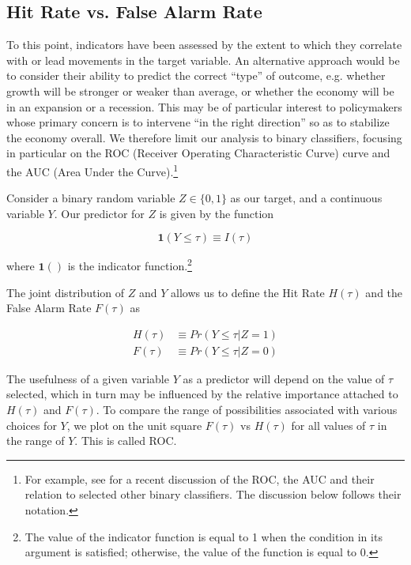 \documentclass[11pt,a4paper]{article}
\begin{document}
\subsection{Hit Rate vs. False Alarm Rate}

To this point, indicators have been assessed by the extent to which they correlate with or lead movements in the target variable. An alternative approach would be to consider their ability to predict the correct ``type'' of outcome, e.g. whether growth will be stronger or weaker than average, or whether the economy will be in an expansion or a recession. 
This may be of particular interest to policymakers whose primary concern is to intervene ``in the right direction'' so as to stabilize the economy overall. We therefore limit our analysis to binary classifiers, focusing in particular on the ROC (Receiver Operating Characteristic Curve) curve and the AUC (Area Under the Curve).\footnote{For example, see \cite{YangLahiriPagan2024ROC} for a recent discussion of the ROC, the AUC and their relation to selected other binary classifiers. The discussion below follows their notation.}

Consider a binary random variable $Z \in \{0,1\}$ as our target, and a continuous variable $Y$. Our predictor for $Z$ is given by the function 

\begin{equation}
    \mathbf{1}(Y \leq \tau) \equiv I(\tau)
\end{equation}

where $\mathbf{1}()$ is the indicator function.\footnote{The value of the indicator function is equal to 1 when the condition in its argument is satisfied; otherwise, the value of the function is equal to 0.}

The joint distribution of $Z$ and $Y$ allows us to define the Hit Rate $H(\tau)$ and the False Alarm Rate $F(\tau)$ as 

\begin{align}
    H(\tau) &\equiv Pr( Y \leq \tau | Z = 1)\\
    F(\tau) &\equiv Pr( Y \leq \tau | Z = 0)
\end{align}

The usefulness of a given variable $Y$ as a predictor will depend on the value of $\tau$ selected, which in turn may be influenced by the relative importance attached to $H(\tau)$ and $F(\tau)$. To compare the range of possibilities associated with various choices for $Y$, we plot on the unit square $F(\tau)$ vs $H(\tau)$ for all values of $\tau$ in the range of $Y$. This is called ROC.
\end{document}

